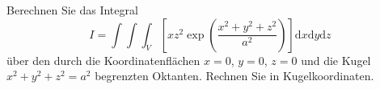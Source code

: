 \begin{atiTask}[
  title = Volumenberechnung II
]
  \providecommand{\D}{\mathrm{d}}
Berechnen Sie das Integral
\[
I=\int \int \int_V\left[xz^2\exp{\left(\frac{x^2+y^2+z^2}{a^2}\right)}\right] \D x\D y\D z
\]
über den durch die Koordinatenflächen $x=0$, $y=0$, $z=0$ und die Kugel $x^2+y^2+z^2=a^2$ begrenzten Oktanten. Rechnen Sie in Kugelkoordinaten.

\atiNote{Es ist \[
\int t^2e^{\alpha t}\; \D t=\frac{e^{\alpha t}\left(\alpha^2t-2\alpha t+2\right)}{\alpha^3}+C
\]}
\end{atiTask}
